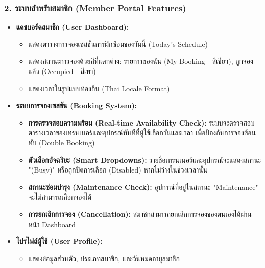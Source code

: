 \subsubsection{2. ระบบสำหรับสมาชิก (Member Portal Features)}
\begin{itemize}
    \item \textbf{แดชบอร์ดสมาชิก (User Dashboard):}
    \begin{itemize}
        \item แสดงตารางการจองเซสชันการฝึกซ้อมของวันนี้ (Today's Schedule)
        \item แสดงสถานะการจองด้วยสีที่แตกต่าง: รายการของฉัน (My Booking - สีเขียว), ถูกจองแล้ว (Occupied - สีเทา)
        \item แสดงเวลาในรูปแบบท้องถิ่น (Thai Locale Format)
    \end{itemize}
    \item \textbf{ระบบการจองเซสชัน (Booking System):}
    \begin{itemize}
        \item \textbf{การตรวจสอบความพร้อม (Real-time Availability Check):} ระบบจะตรวจสอบตารางเวลาของเทรนเนอร์และอุปกรณ์ทันทีที่ผู้ใช้เลือกวันและเวลา เพื่อป้องกันการจองซ้อนทับ (Double Booking)
        \item \textbf{ตัวเลือกอัจฉริยะ (Smart Dropdowns):} รายชื่อเทรนเนอร์และอุปกรณ์จะแสดงสถานะ "(Busy)" หรือถูกปิดการเลือก (Disabled) หากไม่ว่างในช่วงเวลานั้น
        \item \textbf{สถานะซ่อมบำรุง (Maintenance Check):} อุปกรณ์ที่อยู่ในสถานะ "Maintenance" จะไม่สามารถเลือกจองได้
        \item \textbf{การยกเลิกการจอง (Cancellation):} สมาชิกสามารถยกเลิกการจองของตนเองได้ผ่านหน้า Dashboard
    \end{itemize}
    \item \textbf{โปรไฟล์ผู้ใช้ (User Profile):}
    \begin{itemize}
        \item แสดงข้อมูลส่วนตัว, ประเภทสมาชิก, และวันหมดอายุสมาชิก
    \end{itemize}
\end{itemize}

